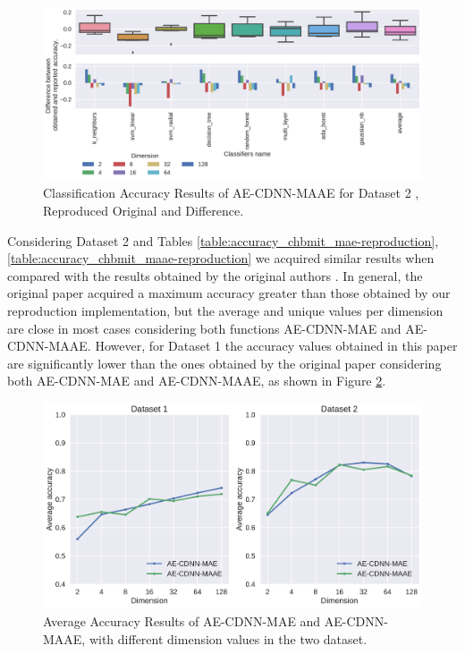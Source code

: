 \begin{figure}[!ht]
  \centering
  \includegraphics[width=\linewidth]{figure/table_5.pdf}
  \caption{Classification Accuracy Results of AE-CDNN-MAAE for Dataset 2 \cite{WenZha:2018}, Reproduced Original and Difference.}
\label{fig:acc-AE-CDNN-MAAE-d2}
\end{figure}


\newpage

Considering Dataset 2 and Tables \ref{table:accuracy_chbmit_mae-reproduction}, \ref{table:accuracy_chbmit_maae-reproduction} we acquired similar results when compared with the results obtained by the original authors \cite{WenZha:2018}. In general, the original paper acquired a maximum accuracy greater than those obtained by our reproduction implementation, but the average and unique values per dimension are close in most cases considering both functions AE-CDNN-MAE and AE-CDNN-MAAE. However, for Dataset 1 the accuracy values obtained in this paper are significantly lower than the ones obtained by the original paper considering both AE-CDNN-MAE and AE-CDNN-MAAE, as shown in Figure \ref{fig:average}. 

\newpage


\begin{figure}[!ht]
\centering
\includegraphics[width=0.8\linewidth]{figure/average-MAE-MAAE.pdf}
  \caption{Average Accuracy Results of AE-CDNN-MAE and AE-CDNN-MAAE, with different dimension values in the two dataset.}
\label{fig:average}
\end{figure}

